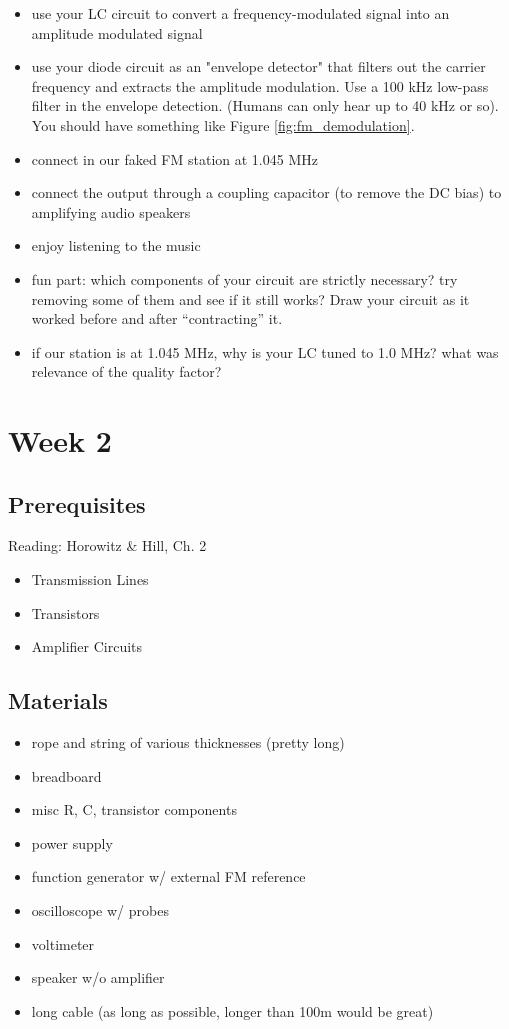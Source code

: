 \documentclass[11pt]{article}
\begin{document}
\begin{itemize}
\item use your LC circuit to convert a frequency-modulated signal into an amplitude modulated signal
\item use your diode circuit as an "envelope detector" that filters out the carrier frequency and extracts the
amplitude modulation.  Use a 100 kHz low-pass filter in the envelope detection. (Humans can only hear up to 40 kHz
or so).  You should have something like Figure \ref{fig:fm_demodulation}.
\item connect in our faked FM station at 1.045 MHz
\item connect the output through a coupling capacitor (to remove the DC bias) to amplifying audio speakers
\item enjoy listening to the music
\item fun part: which components of your circuit are strictly necessary?  try removing some of them and see
if it still works?  Draw your circuit as it worked before and after ``contracting'' it.
\item if our station is at 1.045 MHz, why is your LC tuned to 1.0 MHz?  what was relevance of the quality factor?
\end{itemize}

\section{Week 2}
\subsection*{Prerequisites}

Reading: Horowitz \& Hill, Ch. 2

\begin{itemize}
\item Transmission Lines
\item Transistors
\item Amplifier Circuits
\end{itemize}

\subsection*{Materials}

\begin{itemize}
\item rope and string of various thicknesses (pretty long)
\item breadboard
\item misc R, C, transistor components
\item power supply
\item function generator w/ external FM reference
\item oscilloscope w/ probes
\item voltimeter
\item speaker w/o amplifier
\item long cable (as long as possible, longer than 100m would be great)
\end{itemize}
\end{document}
